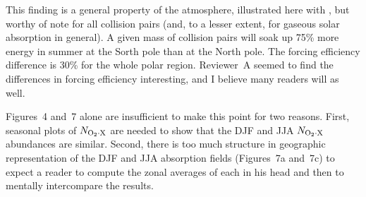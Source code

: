 \documentclass[12pt,twoside]{article}
\begin{document}
\begin{enumerate}
\begin{enumerate}
This finding is a general property of the atmosphere, illustrated here
with \OdX, but worthy of note for all collision pairs
(and, to a lesser extent, for gaseous solar absorption in general). 
A given mass of collision pairs will soak up 75\% more energy in
summer at the Sorth pole than at the North pole.
The forcing efficiency difference is 30\% for the whole polar region. 
Reviewer~A seemed to find the differences in forcing efficiency
interesting, and I believe many readers will as well.

Figures~4 and~7 alone are insufficient to make this point for two
reasons. 
First, seasonal plots of $N_{\mathrm{O}_{2} \cdot \mathrm{X}}$ are needed to show that the DJF
and JJA $N_{\mathrm{O}_{2} \cdot \mathrm{X}}$ abundances are similar.
Second, there is too much structure in geographic representation of
the DJF and JJA absorption fields (Figures~7a and~7c) to expect a
reader to compute the zonal averages of each in his head and then 
to mentally intercompare the results.


\end{enumerate}
\end{enumerate}
\end{document}
